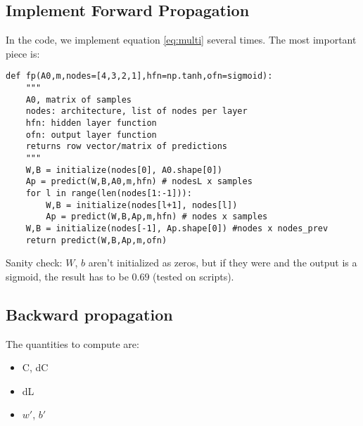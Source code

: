 \subsection{Implement Forward Propagation}
In the code, we implement equation \ref{eq:multi} several times. The most important piece is:

\begin{center}
\begin{BVerbatim}
def fp(A0,m,nodes=[4,3,2,1],hfn=np.tanh,ofn=sigmoid):
    """
    A0, matrix of samples
    nodes: architecture, list of nodes per layer
    hfn: hidden layer function
    ofn: output layer function
    returns row vector/matrix of predictions
    """
    W,B = initialize(nodes[0], A0.shape[0]) 
    Ap = predict(W,B,A0,m,hfn) # nodesL x samples
    for l in range(len(nodes[1:-1])):
        W,B = initialize(nodes[l+1], nodes[l]) 
        Ap = predict(W,B,Ap,m,hfn) # nodes x samples 
    W,B = initialize(nodes[-1], Ap.shape[0]) #nodes x nodes_prev
    return predict(W,B,Ap,m,ofn)
\end{BVerbatim}
\end{center}
Sanity check: $W$, $b$ aren't initialized as zeros, but if they were and the output is a sigmoid, the result has to be $0.69$ (tested on scripts).

\subsection{Backward propagation}
The quantities to compute are:
\begin{itemize}
  \item C, dC
  \item dL
  \item $w'$, $b'$
\end{itemize}
